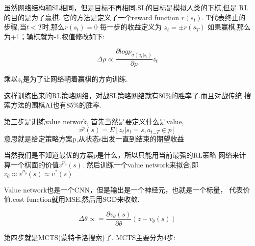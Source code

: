 \documentclass{article}
\begin{document}
            虽然网络结构和SL相同，但是目标不再相同.SL的目标是模拟人类的下棋,但是
            RL的目的是为了赢棋. 它的方法是定义了一个reward function $r(s_t)$.
            T代表终止的步骤,当$t < T$时,那么$r(s_t)=0$ 每一步的收益定义为
            $z_t=\pm r(s_T)$
            如果赢棋,那么为+1；输棋就为-1.权值修改如下:

            \begin{equation}
                \Delta \rho \propto \frac{\partial log p_{\sigma(a_t|s_t)}}{\partial \rho}z_t
            \end{equation}

            乘以$z_t$是为了让网络朝着赢棋的方向训练.

            这样训练出来的RL策略网络，对战SL策略网络就有80\%的胜率了.而且对战传统
            搜索方法的围棋AI也有85\%的胜率.

            第三步是训练value network,
            首先当然是要定义什么是value,
            \begin{equation}
                v^{p}(s) = E[z_t|s_t=s,a_{t...T}\in p]
            \end{equation}
            意思就是给定策略方案p,从状态s出发一直到结束的期望收益

            当然我们是不知道最优的方案p是什么，所以只能用当前最强的RL策略
            网络来计算一个棋面的价值$ v^{p_\rho}(s)$.
            然后训练一个value network来拟合,即
            $v_\theta \approx v^{p_\rho}(s) \approx v^*(s)$

            Value network也是一个CNN，但是输出是一个神经元，也就是一个标量，
            代表价值.cost function就用MSE,然后用SGD来收敛.

            \begin{equation}
                \Delta \theta \propto = \frac{\partial v_\theta(s)}{\partial \theta}(z - v_\theta(s))
            \end{equation}

            第四步就是MCTS(蒙特卡洛搜索)了.
            MCTS主要分为4步:
\end{document}
